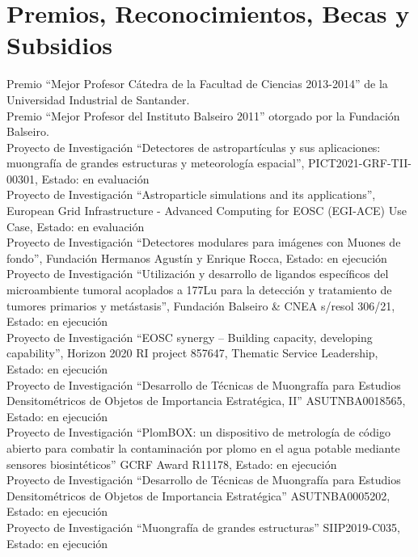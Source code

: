 \section*{Premios, Reconocimientos, Becas y Subsidios}
\noindent
{} Premio ``Mejor Profesor Cátedra de la Facultad de Ciencias 2013-2014'' de la Universidad Industrial de Santander.\\
 Premio ``Mejor Profesor del Instituto Balseiro 2011'' otorgado por la Fundación Balseiro.\\
 Proyecto de Investigación ``Detectores de astropartículas y sus aplicaciones: muongrafía de grandes estructuras y meteorología espacial'', PICT2021-GRF-TII-00301, Estado: en evaluación\\
 Proyecto de Investigación ``Astroparticle simulations and its applications'', European Grid Infrastructure - Advanced Computing for EOSC (EGI-ACE) Use Case, Estado: en evaluación\\
 Proyecto de Investigación ``Detectores modulares para imágenes con Muones de fondo'', Fundación Hermanos Agustín y Enrique Rocca, Estado: en ejecución\\
 Proyecto de Investigación ``Utilización y desarrollo de ligandos específicos del microambiente tumoral acoplados a 177Lu para la detección y tratamiento de tumores primarios y metástasis'', Fundación Balseiro \& CNEA s/resol 306/21, Estado: en ejecución\\
 Proyecto de Investigación ``EOSC synergy – Building capacity, developing capability'', Horizon 2020 RI project 857647, Thematic Service Leadership, Estado: en ejecución\\
 Proyecto de Investigación ``Desarrollo de Técnicas de Muongrafía para Estudios Densitométricos de Objetos de Importancia Estratégica, II'' ASUTNBA0018565, Estado: en ejecución\\
 Proyecto de Investigación ``PlomBOX: un dispositivo de metrología de código abierto para combatir la contaminación por plomo en el agua potable mediante sensores biosintéticos'' GCRF Award R11178, Estado: en ejecución\\
 Proyecto de Investigación ``Desarrollo de Técnicas de Muongrafía para Estudios Densitométricos de Objetos de Importancia Estratégica'' ASUTNBA0005202, Estado: en ejecución\\
 Proyecto de Investigación ``Muongrafía de grandes estructuras'' SIIP2019-C035, Estado: en ejecución\\
